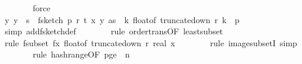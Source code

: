 \begin{isabellebody}
\ \ \ \ \ \ \isamarkupfalse%
\ force\isanewline
\isanewline
\ \ \ \ \isamarkupfalse%
\ {\isachardoublequoteopen}{\isasymAnd}y{\isachardot}{\kern0pt}\ y\ {\isasymin}\ {\isacharbraceleft}{\kern0pt}{}{\isachardot}{\kern0pt}{\isachardot}{\kern0pt}{\isacharless}{\kern0pt}s{\isacharbraceright}{\kern0pt}\ {\isasymLongrightarrow}\ f{}{\isacharunderscore}{\kern0pt}sketch\ p\ r\ t\ {\isacharparenleft}{\kern0pt}x\ y{\isacharparenright}{\kern0pt}\ as\ {\isasymsubseteq}\ {\isacharparenleft}{\kern0pt}{\isasymlambda}k{\isachardot}{\kern0pt}\ float{\isacharunderscore}{\kern0pt}of\ {\isacharparenleft}{\kern0pt}truncate{\isacharunderscore}{\kern0pt}down\ r\ k{\isacharparenright}{\kern0pt}{\isacharparenright}{\kern0pt}\ {\isacharbackquote}{\kern0pt}\ {\isacharbraceleft}{\kern0pt}{}{\isachardot}{\kern0pt}{\isachardot}{\kern0pt}{\isacharless}{\kern0pt}p{\isacharbraceright}{\kern0pt}\ {\isachardoublequoteclose}\isanewline
\ \ \ \ \ \ \isamarkupfalse%
\ {\isacharparenleft}{\kern0pt}simp\ add{\isacharcolon}{\kern0pt}f{}{\isacharunderscore}{\kern0pt}sketch{\isacharunderscore}{\kern0pt}def{\isacharparenright}{\kern0pt}\isanewline
\ \ \ \ \ \ \isamarkupfalse%
\ {\isacharparenleft}{\kern0pt}rule\ order{\isacharunderscore}{\kern0pt}trans{\isacharbrackleft}{\kern0pt}OF\ least{\isacharunderscore}{\kern0pt}subset{\isacharbrackright}{\kern0pt}{\isacharparenright}{\kern0pt}\isanewline
\ \ \ \ \ \ \isamarkupfalse%
\ {\isacharparenleft}{\kern0pt}rule\ f{\isacharunderscore}{\kern0pt}subset{\isacharbrackleft}{\kern0pt}\ f{\isacharequal}{\kern0pt}{\isachardoublequoteopen}{\isasymlambda}x{\isachardot}{\kern0pt}\ float{\isacharunderscore}{\kern0pt}of\ {\isacharparenleft}{\kern0pt}truncate{\isacharunderscore}{\kern0pt}down\ r\ {\isacharparenleft}{\kern0pt}real\ x{\isacharparenright}{\kern0pt}{\isacharparenright}{\kern0pt}{\isachardoublequoteclose}{\isacharbrackright}{\kern0pt}{\isacharparenright}{\kern0pt}\isanewline
\ \ \ \ \ \ \isamarkupfalse%
\ {\isacharparenleft}{\kern0pt}rule\ image{\isacharunderscore}{\kern0pt}subsetI{\isacharcomma}{\kern0pt}\ simp{\isacharparenright}{\kern0pt}\isanewline
\ \ \ \ \ \ \isamarkupfalse%
\ {\isacharparenleft}{\kern0pt}rule\ hash{\isacharunderscore}{\kern0pt}range{\isacharbrackleft}{\kern0pt}OF\ p{\isacharunderscore}{\kern0pt}ge{\isacharunderscore}{\kern0pt}{}{\isacharcomma}{\kern0pt}\ \ n{\isacharequal}{\kern0pt}{\isachardoublequoteopen}{}{\isachardoublequoteclose}{\isacharbrackright}{\kern0pt}{\isacharparenright}{\kern0pt}\isanewline

\end{isabellebody}
